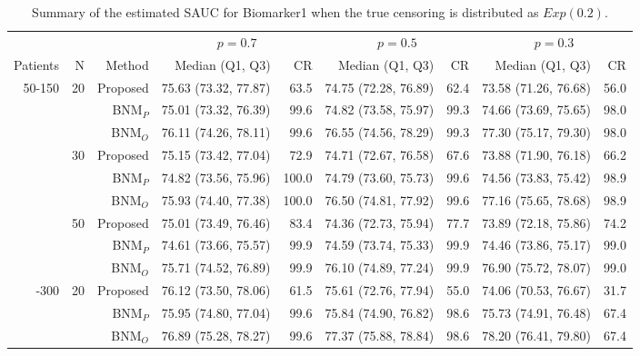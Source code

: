 \begin{table}[!htb]

\caption{\label{tab:sauc1}Summary of the estimated SAUC for Biomarker1 when the true censoring is distributed as $Exp(0.2)$.}
\centering
\begin{threeparttable}
\begin{tabular}[t]{rrrrrrrrr}
\toprule
\multicolumn{1}{c}{} & \multicolumn{1}{c}{} & \multicolumn{1}{c}{} & \multicolumn{2}{c}{$p = 0.7$} & \multicolumn{2}{c}{$p = 0.5$} & \multicolumn{2}{c}{$p = 0.3$} \\
\cmidrule(l{3pt}r{3pt}){4-5} \cmidrule(l{3pt}r{3pt}){6-7} \cmidrule(l{3pt}r{3pt}){8-9}
Patients & N & Method & Median (Q1, Q3) & CR & Median (Q1, Q3) & CR & Median (Q1, Q3) & CR\\
\midrule
50-150 & 20 & Proposed & 75.63 (73.32, 77.87) & 63.5 & 74.75 (72.28, 76.89) & 62.4 & 73.58 (71.26, 76.68) & 56.0\\
 &  & BNM$_P$ & 75.01 (73.32, 76.39) & 99.6 & 74.82 (73.58, 75.97) & 99.3 & 74.66 (73.69, 75.65) & 98.0\\
 &  & BNM$_O$ & 76.11 (74.26, 78.11) & 99.6 & 76.55 (74.56, 78.29) & 99.3 & 77.30 (75.17, 79.30) & 98.0\\
\addlinespace
 & 30 & Proposed & 75.15 (73.42, 77.04) & 72.9 & 74.71 (72.67, 76.58) & 67.6 & 73.88 (71.90, 76.18) & 66.2\\
 &  & BNM$_P$ & 74.82 (73.56, 75.96) & 100.0 & 74.79 (73.60, 75.73) & 99.6 & 74.56 (73.83, 75.42) & 98.9\\
 &  & BNM$_O$ & 75.93 (74.40, 77.38) & 100.0 & 76.50 (74.81, 77.92) & 99.6 & 77.16 (75.65, 78.68) & 98.9\\
\addlinespace
 & 50 & Proposed & 75.01 (73.49, 76.46) & 83.4 & 74.36 (72.73, 75.94) & 77.7 & 73.89 (72.18, 75.86) & 74.2\\
 &  & BNM$_P$ & 74.61 (73.66, 75.57) & 99.9 & 74.59 (73.74, 75.33) & 99.9 & 74.46 (73.86, 75.17) & 99.0\\
 &  & BNM$_O$ & 75.71 (74.52, 76.89) & 99.9 & 76.10 (74.89, 77.24) & 99.9 & 76.90 (75.72, 78.07) & 99.0\\
\addlinespace
50-300 & 20 & Proposed & 76.12 (73.50, 78.06) & 61.5 & 75.61 (72.76, 77.94) & 55.0 & 74.06 (70.53, 76.67) & 31.7\\
 &  & BNM$_P$ & 75.95 (74.80, 77.04) & 99.6 & 75.84 (74.90, 76.82) & 98.6 & 75.73 (74.91, 76.48) & 67.4\\
 &  & BNM$_O$ & 76.89 (75.28, 78.27) & 99.6 & 77.37 (75.88, 78.84) & 98.6 & 78.20 (76.41, 79.80) & 67.4\\

\end{tabular}
\end{threeparttable}
\end{table}
